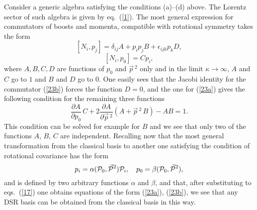 \documentclass [prd,twocolumn,nofootinbib,showpacs]  {revtex4}
\begin{document}
Consider a generic algebra satisfying the conditions (a)--(d)
above. The Lorentz sector of such algebra is  given by
eq.~(\ref{1}). The most general expression for commutators of
boosts and momenta, compatible with rotational symmetry takes the
form
\begin{equation}\label{23a}
 [N_i, p_j] = \delta_{ij} A + p_i p_j B + \epsilon_{ijk} p_k D,
\end{equation}
\begin{equation}\label{23b}
  [N_i, p_0] = C p_i,
\end{equation}
where $A,B,C,D$ are functions of $p_0$ and $\vec{p}\,{}^2$ only
and in the limit $\kappa\rightarrow\infty$, $A$  and $C$ go to $1$
and $B$ and $D$ go to $0$. One easily sees that the Jacobi
identity for the commutator (\ref{23b})  forces the function $D
=0$, and the one for (\ref{23a}) gives the following condition for
the remaining three functions
\begin{equation}\label{24}
 \frac{\partial A}{\partial p_0} \, C + 2 \frac{\partial A}{\partial \vec{p}\,{}^2}
 \left(A + \vec{p}\,{}^2 \, B\right) - AB = 1.
\end{equation}
This condition can be solved for example for $B$ and we see that
only two of the functions  $A$, $B$, $C$ are independent.
Recalling now that the most general transformation from the
classical basis to another one satisfying the condition of
rotational covariance has the form
\begin{equation}\label{25}
p_i = \alpha({\cal P}_0, \vec{{\cal    P}}{}^2){\cal P}_i, \quad p_0 = \beta({\cal P}_0, \vec{{\cal    P}}{}^2),
\end{equation}
and is defined by two arbitrary functions $\alpha$ and $\beta$,
and that, after substituting  to eqs.~(\ref{17}) one obtains
equations of the form (\ref{23a}), (\ref{23b}), we see that any
DSR basis can be obtained from the classical basis in this way.
\end{document}
